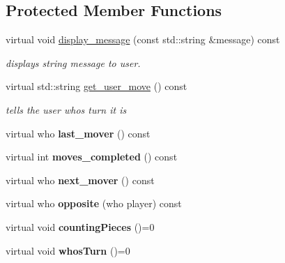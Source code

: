 \subsection*{Protected Member Functions}
\begin{DoxyCompactItemize}
\item 
virtual void \hyperlink{classmain__savitch__14_1_1game_ab8b87c3a1b68634861a8c0ed2b9f1992}{display\+\_\+message} (const std\+::string \&message) const 
\begin{DoxyCompactList}\small\item\em displays string message to user. \end{DoxyCompactList}\item 
virtual std\+::string \hyperlink{classmain__savitch__14_1_1game_a1265f262f5a15bca5b532e6e97d13089}{get\+\_\+user\+\_\+move} () const 
\begin{DoxyCompactList}\small\item\em tells the user whos turn it is \end{DoxyCompactList}\item 
virtual who {\bfseries last\+\_\+mover} () const \hypertarget{classmain__savitch__14_1_1game_a38d435da6aadc192ac10160b26ea0cc1}{}\label{classmain__savitch__14_1_1game_a38d435da6aadc192ac10160b26ea0cc1}

\item 
virtual int {\bfseries moves\+\_\+completed} () const \hypertarget{classmain__savitch__14_1_1game_aee677d1ef52c35474cb7c6071bb71749}{}\label{classmain__savitch__14_1_1game_aee677d1ef52c35474cb7c6071bb71749}

\item 
virtual who {\bfseries next\+\_\+mover} () const \hypertarget{classmain__savitch__14_1_1game_a0d445fdec3201c91c145ee2763e08922}{}\label{classmain__savitch__14_1_1game_a0d445fdec3201c91c145ee2763e08922}

\item 
virtual who {\bfseries opposite} (who player) const \hypertarget{classmain__savitch__14_1_1game_ae38d001e92ebe46e1a1433e41446c7ab}{}\label{classmain__savitch__14_1_1game_ae38d001e92ebe46e1a1433e41446c7ab}

\item 
virtual void {\bfseries counting\+Pieces} ()=0\hypertarget{classmain__savitch__14_1_1game_a5954eccb6abf1ae900ad853ad2af99fa}{}\label{classmain__savitch__14_1_1game_a5954eccb6abf1ae900ad853ad2af99fa}

\item 
virtual void {\bfseries whos\+Turn} ()=0\hypertarget{classmain__savitch__14_1_1game_a98190a2bf784ce0f20533475754d136d}{}\label{classmain__savitch__14_1_1game_a98190a2bf784ce0f20533475754d136d}


\end{DoxyCompactItemize}
